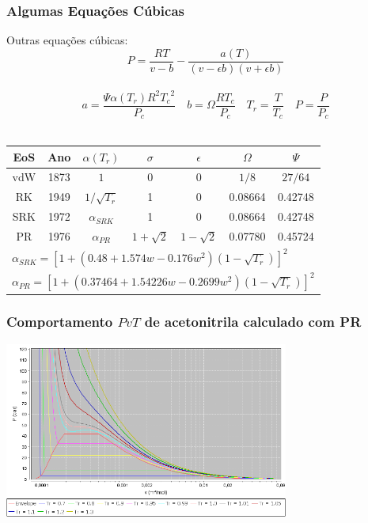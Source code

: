 \documentclass[aspectratio=169]{beamer}
\begin{document}
\begin{frame}[plain]
	\frametitle{Algumas Equações Cúbicas}
	Outras equações cúbicas:
	\begin{equation*}
		P= \frac{RT}{v-b}-\frac{a(T)}{(v-\epsilon b)(v+\epsilon b)}
	\end{equation*}
	\\
	\begin{equation*}
		a= \frac{\Psi \alpha(T_r) R^2 {T_c}^2}{P_c} \quad b= \Omega \frac{RT_c}{P_c}
		\quad T_r = \frac{T}{T_c} \quad P= \frac{P}{P_c}
	\end{equation*}
	\\
	\begin{table}
		\begin{tabular}{cc|ccccc}
		\hline
		{EoS} & Ano & {$\alpha(T_r)$} & {$\sigma$}& {$\epsilon$}&
		{$\Omega$}& {$\Psi$} \\
		\hline
		vdW  & 1873& $1$ & 0 & 0 & $1/8$ & $27/64$\\
		RK & 1949 & $1/\sqrt{T_r}$ & 1 & 0 & 0.08664& 0.42748\\
		SRK & 1972 & $\alpha_{SRK}$ & 1 & 0 & 0.08664& 0.42748\\
		PR & 1976 & $\alpha_{PR}$ & $1+\sqrt{2}$ & $1-\sqrt{2}$ & 0.07780 & 0.45724\\
		\hline
		\multicolumn{7}{l}{$\alpha_{SRK}=\left[1+\left(0.48+1.574w-0.176w^2\right)
		\left(1-\sqrt{T_r}\right) \right]^2$}\\
		\multicolumn{7}{l}{$\alpha_{PR}=\left[1+\left(0.37464+1.54226w-0.2699w^2\right)
		\left(1-\sqrt{T_r}\right) \right]^2$}\\
		\hline
		\end{tabular}
	\end{table}
\end{frame}

\begin{frame}
	\frametitle{Comportamento $PvT$ de acetonitrila calculado com PR}
	\begin{center}
		\includegraphics[width=0.7\textwidth]{img/Acetonitrila.png} 
	\end{center}
\end{frame}
\end{document}
